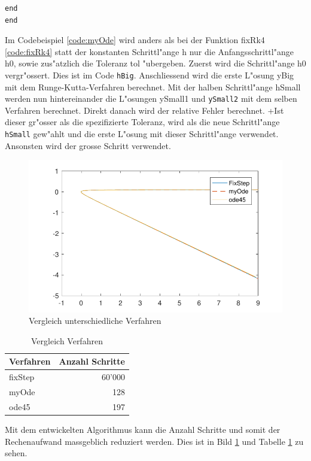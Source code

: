 \begin{refsection}
\begin{lstlisting}[style=Matlab, caption=Variable Schrittl"ange, captionpos=b, label=code:myOde]
    end
end
\end{lstlisting}
Im Codebeispiel \ref{code:myOde} wird anders als bei der Funktion fixRk4 \ref{code:fixRk4} statt der konstanten Schrittl"ange h nur die Anfangsschrittl"ange h0, sowie zus"atzlich die Toleranz tol "ubergeben.
Zuerst wird die Schrittl"ange h0 vergr"ossert.
Dies ist im Code \texttt{hBig}.
Anschliessend wird die erste L"osung yBig mit dem Runge-Kutta-Verfahren berechnet.
Mit der halben Schrittl"ange hSmall werden nun hintereinander die L"osungen ySmall1 und \texttt{ySmall2} mit dem selben Verfahren berechnet.
Direkt danach wird der relative Fehler berechnet.
+Ist dieser gr"osser als die spezifizierte Toleranz, wird als die neue Schrittl"ange \texttt{hSmall} gew"ahlt und die erste L"osung mit dieser Schrittl"ange verwendet.
Ansonsten wird der grosse Schritt verwendet.
\begin{figure}
\centering
\includegraphics{schrittlaenge/images/vergleichVerfahren.pdf}
\caption{Vergleich unterschiedliche Verfahren}
\label{image:vergleichVerfahren}
\end{figure}
\begin{table}
\centering
\begin{tabular}{|l|r|}
\hline
Verfahren & Anzahl Schritte\\ \hline
fixStep & 60'000\\ \hline
myOde & 128\\ \hline
ode45 & 197\\ \hline
\end{tabular}
\caption{Vergleich Verfahren}
\label{table:vergleichVerfahren}
\end{table}
Mit dem entwickelten Algorithmus kann die Anzahl Schritte und somit der Rechenaufwand massgeblich reduziert werden.
Dies ist in Bild \ref{image:vergleichVerfahren} und Tabelle \ref{table:vergleichVerfahren} zu sehen.

\end{refsection}
